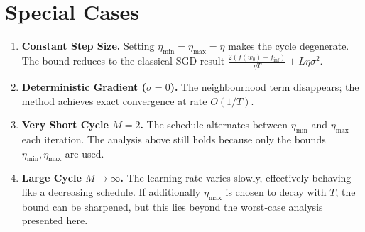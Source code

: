 \documentclass{article}
\begin{document}
\section*{Special Cases}
\begin{enumerate}[label=\alph*)]
\item \textbf{Constant Step Size.} Setting $\eta_{\min}=\eta_{\max}=\eta$ makes the cycle degenerate. The bound reduces to the classical SGD result $\frac{2(f(w_0)-f_{\inf})}{\eta T}+L\eta\sigma^{2}$.

\item \textbf{Deterministic Gradient ($\sigma=0$).} The neighbourhood term disappears; the method achieves exact convergence at rate $O(1/T)$.

\item \textbf{Very Short Cycle $M=2$.} The schedule alternates between $\eta_{\min}$ and $\eta_{\max}$ each iteration. The analysis above still holds because only the bounds $\eta_{\min},\eta_{\max}$ are used.

\item \textbf{Large Cycle $M\to\infty$.} The learning rate varies slowly, effectively behaving like a decreasing schedule. If additionally $\eta_{\max}$ is chosen to decay with $T$, the bound can be sharpened, but this lies beyond the worst‑case analysis presented here.
\end{enumerate}
\end{document}
